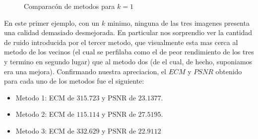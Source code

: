 \begin{figure}[H]
    \centering
    \qquad
    \qquad
    \caption{Comparacón de metodos para $k = 1$}
    \label{fig:example}
\end{figure}

En este primer ejemplo, con un $k$ minimo, ninguna de las tres imagenes presenta una calidad demasiado desmejorada. En particular nos sorprendio ver la cantidad de ruido introducida por el tercer metodo, que visualmente esta mas cerca al metodo de los vecinos (el cual se perfilaba como el de peor rendimiento de los tres y termino en segundo lugar) que al metodo dos (de el cual, de hecho, suponiamos era una mejora).
Confirmando nuestra apreciacion, el $ECM$ y $PSNR$ obtenido para cada uno de los metodos fue el siguiente:
\begin{itemize}
 \item Metodo 1: ECM de $315.723$ y PSNR de $23.1377$.
 \item Metodo 2: ECM de $115.114$ y PSNR de $27.5195$.
 \item Metodo 3: ECM de $332.629$ y PSNR de $22.9112$
\end{itemize}

